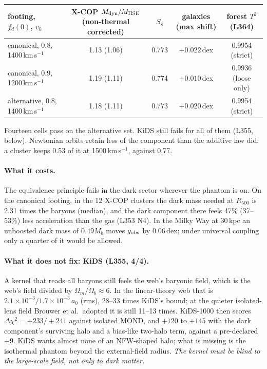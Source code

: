 \documentclass[10pt]{article}
\begin{document}
{\footnotesize\centering
\begin{tabular}{@{}lcccc@{}}
\toprule
footing, $f_d(0)$, $v_k$ & X-COP $M_{\rm dyn}/M_{\rm HSE}$ (non-thermal corrected) & $S_8$ & galaxies (max shift) & forest $T^2$ (L364)\\
\midrule
canonical, 0.8, 1400\,km\,s$^{-1}$ & 1.13 (1.06) & 0.773 & $+0.022$\,dex & 0.9954 (strict)\\
canonical, 0.9, 1200\,km\,s$^{-1}$ & 1.19 (1.11) & 0.774 & $+0.010$\,dex & 0.9936 (loose only)\\
alternative, 0.8, 1400\,km\,s$^{-1}$ & 1.18 (1.11) & 0.773 & $+0.020$\,dex & 0.9954 (strict)\\
\bottomrule
\end{tabular}\par}
\smallskip
Fourteen cells pass on the alternative set. KiDS still fails for all of them (L355, below). Newtonian orbits retain less of the component than the additive law did: a cluster keeps 0.53 of it at 1500\,km\,s$^{-1}$, against 0.77.

\paragraph{What it costs.} The equivalence principle fails in the dark sector wherever the phantom is on. On the canonical footing, in the 12 X-COP clusters the dark mass needed at $R_{500}$ is 2.31 times the baryons (median), and the dark component there feels 47\% (37--53\%) less acceleration than the gas (L353 N4). In the Milky Way at 30\,kpc an unboosted dark mass of $0.49M_b$ moves $g_{\rm obs}$ by 0.06\,dex; under universal coupling only a quarter of it would be allowed.

\paragraph{What it does not fix: KiDS (L355, 4/4).} A kernel that reads all baryons still feels the web's baryonic field, which is the web's field divided by $\Omega_m/\Omega_b\approx6$. In the linear-theory web that is $2.1\times10^{-3}/1.7\times10^{-3}\,a_0$ (rms), 28--33 times KiDS's bound; at the quieter isolated-lens field Brouwer et al.\ adopted it is still 11--13 times. KiDS-1000 then scores $\Delta\chi^2=+233/+241$ against isolated MOND, and $+120$ to $+145$ with the dark component's surviving halo and a bias-like two-halo term, against a pre-declared $+9$. KiDS wants almost none of an NFW-shaped halo; what is missing is the isothermal phantom beyond the external-field radius. \emph{The kernel must be blind to the large-scale field, not only to dark matter.}
\end{document}
